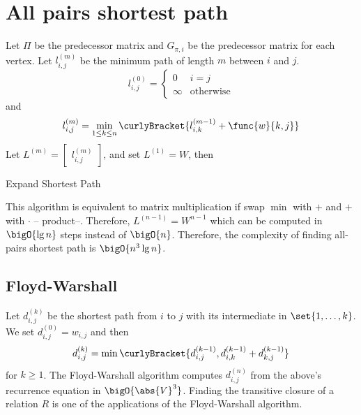 \section*{All pairs shortest path}
Let \(\Pi\) be the predecessor matrix and \(G_{\pi,i}\) be the predecessor matrix for each vertex. Let \(l_{i,j}^{(m)}\) be the minimum path of length \(m\) between \(i\) and \(j\). 
\begin{equation*}
    l_{i,j}^{(0)} = \begin{cases}
        0 & i = j \\
        \infty & \mathrm{otherwise}
    \end{cases}
\end{equation*}
and 
\begin{equation*}
    l_{i,j}^{(m)} = \min_{1 \leq k \leq n} \curlyBracket{l_{i,k}^{(m-1)} + \func{w}{k,j}}
\end{equation*}
Let \(L^{(m)} = \begin{bmatrix}
    l_{i,j}^{(m)}
\end{bmatrix}\), and set \(L^{(1)} = W\), then 
\begin{algorithm}
    \DontPrintSemicolon
    \caption{Expand Shortest Path}
\end{algorithm}
This algorithm is equivalent to matrix multiplication if swap \(\min\) with \(+\) and \(+\) with \(\cdot\) -- product--. Therefore, \(L^{(n-1)} = W^{n-1}\) which can be computed in \(\bigO{\lg n}\) steps instead of \(\bigO{n}\). Therefore, the complexity of finding all-pairs shortest path is \(\bigO{n^3 \lg n}\).
\subsection*{Floyd-Warshall}
Let \(d_{i,j}^{(k)}\) be the shortest path from \(i\) to \(j\) with its intermediate in \(\set{1,\dots, k}\). We set \(d_{i,j}^{(0)} = w_{i,j}\) and then
\begin{equation*}
    d_{i,j}^{(k)} = \min \curlyBracket{d_{i,j}^{(k-1)}, d_{i,k}^{(k-1)} + d_{k,j}^{(k-1)}}
\end{equation*}
for \(k \geq 1\). The Floyd-Warshall algorithm computes \(d_{i,j}^{(n)}\) from the above's recurrence equation in \(\bigO{\abs{V}^3}\). Finding the transitive closure of a relation \(R\) is one of the applications of the Floyd-Warshall algorithm.
